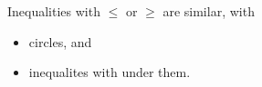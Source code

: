 \vfill 

\begin{tcolorbox}[center,width=5in,boxrule=0.5pt,]
    Inequalities with {\large$\le$} or {\large$\ge$} are {similar}, with 
    \begin{itemize}[topsep=0in]
        \item {}  circles, and 
        \item inequalites with   under them.
    \end{itemize}
\end{tcolorbox}
